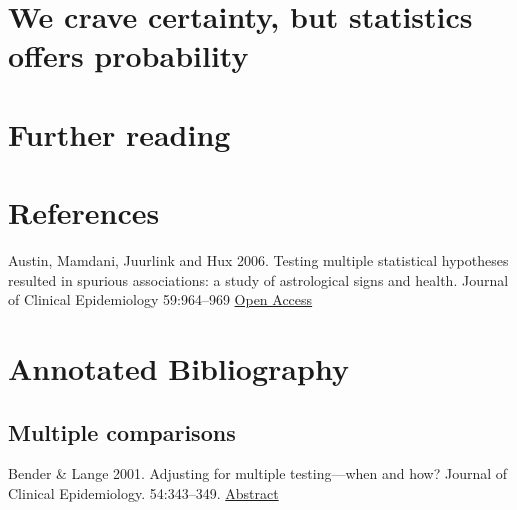 \documentclass[]{book}
\theoremstyle{definition}
\theoremstyle{definition}
\theoremstyle{definition}
\theoremstyle{remark}
\begin{document}
\section{We crave certainty, but statistics offers
probability}\label{we-crave-certainty-but-statistics-offers-probability}

\section{Further reading}\label{further-reading}

\section{References}\label{references}

Austin, Mamdani, Juurlink and Hux 2006. Testing multiple statistical
hypotheses resulted in spurious associations: a study of astrological
signs and health. Journal of Clinical Epidemiology 59:964--969
\href{https://www.jclinepi.com/article/S0895-4356(06)00124-7/abstract?code=jce-site}{Open
Access}

\section{Annotated Bibliography}\label{annotated-bibliography}

\subsection{Multiple comparisons}\label{multiple-comparisons}

Bender \& Lange 2001. Adjusting for multiple testing---when and how?
Journal of Clinical Epidemiology. 54:343--349.
\href{https://www.jclinepi.com/article/S0895-4356(00)00314-0/abstract?code=jce-site}{Abstract}
\end{document}
